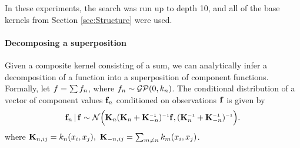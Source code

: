 \documentclass[twoside]{article}
\begin{document}
In these experiments, the search was run up to depth 10, and all of the base kernels from Section \ref{sec:Structure} were used.




\paragraph{Decomposing a superposition}
\label{sec:decomposing}
Given a composite kernel consisting of a sum, %
we can analytically infer a decomposition of a function into a superposition of component functions.
Formally,
let ${f = \sum f_n}$, where ${f_n \sim \mathcal{GP}( 0, k_n)}$.
The conditional distribution of a vector of component values ${\bf{f}}_n$ conditioned on observations ${\bf{f}}$ is given by
\[
\vf_n \given \vf \sim \mathcal{N} \Big( \vK_n (\vK_n + \vK_{-n}\inv)\inv \vf, (\vK_n\inv + \vK_{-n}\inv)\inv \Big).
\]
where ${\mathbf{K}_{n,ij} = k_n(x_i,x_j),\,\,\mathbf{K}_{-n,ij} = \sum_{m\neq n}k_m(x_i,x_j)}$. 
\end{document}
